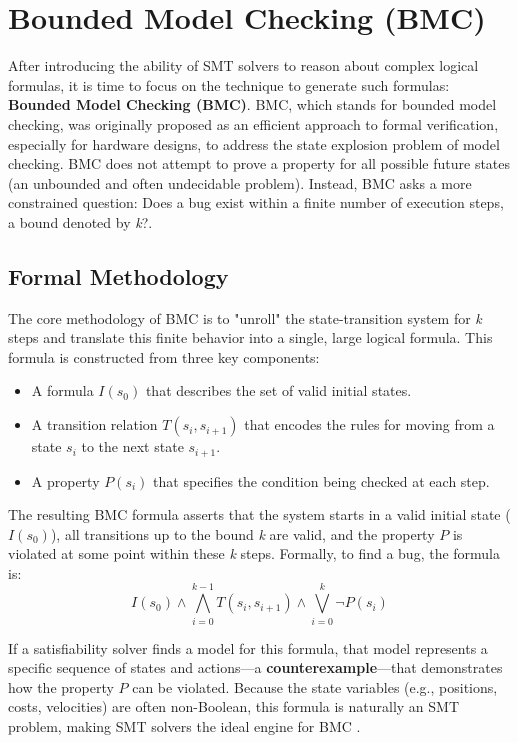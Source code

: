 \documentclass[12pt, a4paper, oneside]{report} %
\begin{document}
\section{Bounded Model Checking (BMC)}
\label{sec:bmc}
After introducing the ability of SMT solvers to reason about complex logical formulas, it is time to focus on the technique to generate such formulas: \textbf{Bounded Model Checking (BMC)}. BMC, which stands for bounded model checking, was originally proposed as an efficient approach to formal verification, especially for hardware designs, to address the state explosion problem of model checking. BMC does not attempt to prove a property for all possible future states (an unbounded and often undecidable problem). Instead, BMC asks a more constrained question: Does a bug exist within a finite number of execution steps, a bound denoted by \textit{k}?\cite{Clarke2001_BMC}.

\subsection{Formal Methodology}

The core methodology of BMC is to "unroll" the state-transition system for \textit{k} steps and translate this finite behavior into a single, large logical formula. This formula is constructed from three key components:
\begin{itemize}
    \item A formula $I(s_0)$ that describes the set of valid initial states.
    \item A transition relation $T(s_i, s_{i+1})$ that encodes the rules for moving from a state $s_i$ to the next state $s_{i+1}$.
    \item A property $P(s_i)$ that specifies the condition being checked at each step.
\end{itemize}

The resulting BMC formula asserts that the system starts in a valid initial state ($I(s_0)$), all transitions up to the bound \textit{k} are valid, and the property $P$ is violated at some point within these \textit{k} steps. Formally, to find a bug, the formula is:
\[
I(s_0) \land \bigwedge_{i=0}^{k-1} T(s_i, s_{i+1}) \land \bigvee_{i=0}^{k} \neg P(s_i)
\]

If a satisfiability solver finds a model for this formula, that model represents a specific sequence of states and actions---a \textbf{counterexample}---that demonstrates how the property $P$ can be violated. Because the state variables (e.g., positions, costs, velocities) are often non-Boolean, this formula is naturally an SMT problem, making SMT solvers the ideal engine for BMC \cite{Barrett2018_Handbook}.
\end{document}

